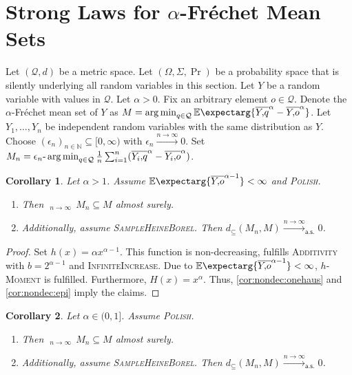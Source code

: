 \documentclass{scrartcl}
\renewcommand{\subset}{\subseteq}
\newcommand{\Ex}{\E\expectarg}
\newcommand*{\mc}[1]{\mathcal{#1}}
\newcommand*{\ms}[1]{\mathsf{#1}}
\newcommand{\N}{\mathbb{N}}
\DeclareMathOperator*{\argmin}{arg\,min}
\DeclareMathOperator*{\outerlim}{lim\, \overline{sup}}
\theoremstyle{plain}\newtheorem{theorem}{Theorem}[section]
\newtheorem{corollary}[theorem]{Corollary}
\theoremstyle{definition}
\theoremstyle{remark}
\begin{document}
 \section{Strong Laws for $\alpha$-Fréchet Mean Sets}\label{sec:power}
Let $(\mc Q, d)$ be a metric space. Let $(\Omega, \Sigma, \Pr)$ be a probability space that is silently underlying all random variables in this section. Let $Y$ be a random variable with values in $\mc Q$.
Let $\alpha > 0$. Fix an arbitrary element $o\in\mc Q$. Denote the $\alpha$-Fréchet mean set of $Y$ as $M = \argmin_{q\in\mc Q} \Ex{\ol Yq^\alpha - \ol Yo^\alpha}$.
Let $Y_1, \dots, Y_n$ be independent random variables with the same distribution as $Y$.
Choose $(\epsilon_n)_{n\in\N}\subset [0,\infty)$ with $\epsilon_n \xrightarrow{n\to\infty}0$. Set $M_n =\epsilon_n\text{-}\argmin_{q\in\mc Q} \frac1n \sum_{i=1}^n (\ol {Y_i}q^\alpha - \ol{Y_i}o^\alpha)$.
\begin{corollary}\label{cor:cons_da}
	Let $\alpha > 1$.
	Assume $\Ex{\ol Yo^{\alpha-1}} < \infty$ and \textsc{Polish}.	
	\begin{enumerate}[label=(\roman*)]
	\item Then $\outerlim_{n\to\infty}\, M_n \subset M$ almost surely.
	\item Additionally, assume \textsc{SampleHeineBorel}.
		Then $d_\subset(M_n, M) \xrightarrow{n\to\infty}_{\ms{a.s.}} 0$.
	\end{enumerate}	
\end{corollary}
\begin{proof}
	Set $h(x) = \alpha x^{\alpha-1}$. This function is non-decreasing, fulfills \textsc{Additivity} with $b = 2^{\alpha-1}$ and \textsc{InfiniteIncrease}.
	Due to $\Ex{\ol Yo^{\alpha-1}} < \infty$, \textsc{$h$-Moment} is fulfilled. Furthermore, $H(x) = x^\alpha$. Thus, \autoref{cor:nondec:onehaus} and \autoref{cor:nondec:epi} imply the claims.
\end{proof}
\begin{corollary}\label{cor:median}
	Let $\alpha \in (0,1]$. Assume \textsc{Polish}.
	\begin{enumerate}[label=(\roman*)]
	\item Then $\outerlim_{n\to\infty}\, M_n \subset M$ almost surely.
	\item Additionally, assume \textsc{SampleHeineBorel}.
		Then $d_\subset(M_n, M) \xrightarrow{n\to\infty}_{\ms{a.s.}} 0$.
	\end{enumerate}	
\end{corollary}
\end{document}
